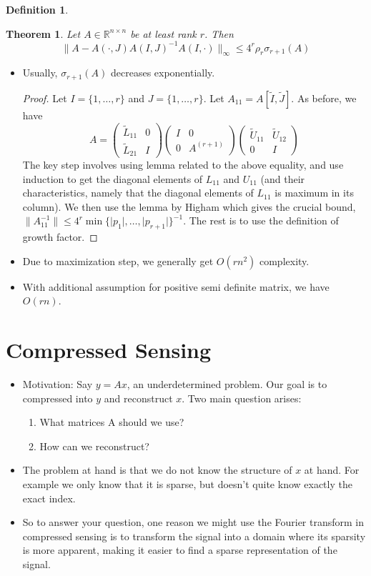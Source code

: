 \documentclass[11pt,reqno]{amsart}
\newtheorem{theorem}{Theorem}
\newtheorem{definition}{Definition}
\theoremstyle{remark}
\begin{document}
\begin{sloppypar}
\begin{definition}
\end{definition}
\begin{theorem}
Let $A\in\mathbb{R}^{n\times n}$ be at least rank $r$. Then 
\[
\lVert A-A(\cdot, J)A(I,J)^{-1}A(I,\cdot)\rVert_{\infty}\leq 4^r \rho_r\sigma_{r+1}(A)  
\]
\end{theorem}
\begin{itemize}
\item Usually, $\sigma_{r+1}(A)$ decreases exponentially.
\begin{proof}
Let $I=\{1,\dots,r\}$ and $J=\{1,\dots,r\}$. Let $A_{11}=A[\tilde I, \tilde J]$.
As before, we have 
\[A=
\begin{pmatrix}
\tilde L_{11} & 0\\
\tilde L_{21} & I
\end{pmatrix}
\begin{pmatrix}
I & 0\\
0 & A^{(r+1)}
\end{pmatrix}
\begin{pmatrix}
\tilde U_{11} & \tilde U_{12}\\
0 & I
\end{pmatrix}
\]
The key step involves using lemma related to the above equality, and use induction to get the diagonal elements of $L_{11}$ and $U_{11}$ (and their characteristics, namely that the diagonal elements of $L_{11}$ is maximum in its column).
We then use the lemma by Higham which gives the crucial bound, $\lVert A_{11}^{-1}\rVert\leq 4^r\min\{\lvert p_1\rvert,\dots,\lvert p_{r+1}\rvert\}^{-1}$. The rest is to use the definition of growth factor.
\end{proof}

\item Due to maximization step, we generally get $O(rn^2)$ complexity.
\item With additional assumption for positive semi definite matrix, we have $O(rn)$.
\end{itemize}

\section{Compressed Sensing}
\begin{itemize}
\item Motivation: Say $y=Ax$, an underdetermined problem. Our goal is to compressed into 
$y$ and reconstruct $x$. Two main question arises:
\begin{enumerate}
\item What matrices A should we use?
\item How can we reconstruct?
\end{enumerate}
\item The problem at hand is that we do not know the structure of $x$ at hand. For example we only know that it is sparse, but doesn't quite
 know exactly the exact index.
\item So to answer your question, one reason we might use 
the Fourier transform in compressed sensing is to transform 
the signal into a domain where its sparsity is more apparent, 
making it easier to find a sparse representation of the signal.
\end{itemize}


\end{sloppypar}
\end{document}
